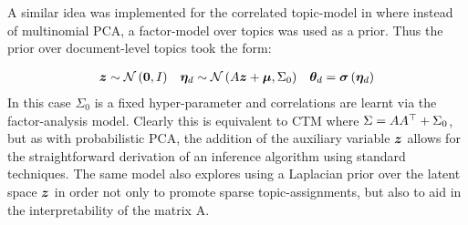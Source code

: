 A similar idea was implemented for the correlated topic-model in \cite{Putthividhya2009} where instead of multinomial PCA, a factor-model over topics was used as a prior. Thus the prior over document-level topics took the form:

\begin{align}
\bm z & \sim \mathcal{N} \left( {\bm 0}, {I} \right) & \bm \eta_d & \sim \mathcal{N} \left( {A\bm z + \bm \mu}, {\Sigma_0} \right) & { \bm \theta_d } = \bm \sigma\left(\bm \eta_d\right) 
\end{align}
In this case $\Sigma_0$ is a fixed hyper-parameter and correlations are learnt via the factor-analysis model. Clearly this is equivalent to CTM where $\Sigma = AA^\top + \Sigma_0$, but as with probabilistic PCA, the addition of the auxiliary variable $\bm z$ allows for the straightforward derivation of an inference algorithm using standard techniques. The same model also explores using a Laplacian prior over the latent space $\bm z$ in order not only to promote sparse topic-assignments, but also to aid in the interpretability of the matrix A.




